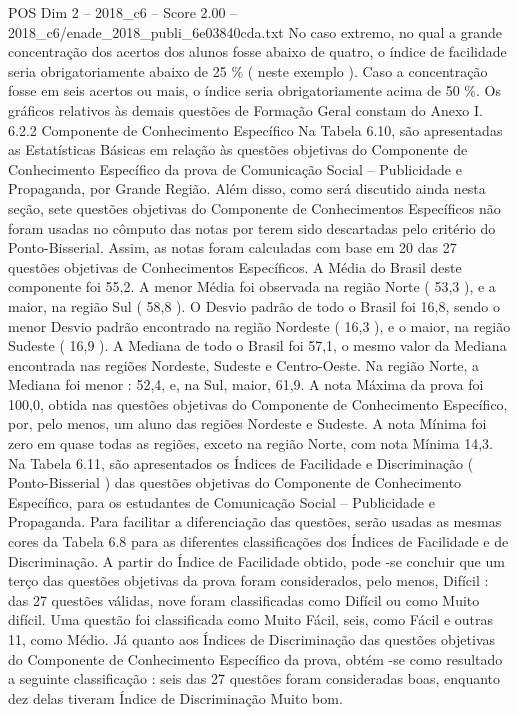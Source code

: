 \begin{textsample}{POS Dim 2 – 2018\_c6 – Score 2.00 – 2018\_c6/enade\_2018\_publi\_6e03840cda.txt}
No caso extremo, no qual a grande concentração dos acertos dos alunos fosse abaixo de quatro, o índice de facilidade seria obrigatoriamente abaixo de 25 \% ( neste exemplo ).
Caso a concentração fosse em seis acertos ou mais, o índice seria obrigatoriamente acima de 50 \%.
Os gráficos relativos às demais questões de Formação Geral constam do Anexo I. 6.2.2 Componente de Conhecimento Específico Na Tabela 6.10, são apresentadas as Estatísticas Básicas em relação às questões objetivas do Componente de Conhecimento Específico da prova de Comunicação Social – Publicidade e Propaganda, por Grande Região.
Além disso, como será discutido ainda nesta seção, sete questões objetivas do Componente de Conhecimentos Específicos não foram usadas no cômputo das notas por terem sido descartadas pelo critério do Ponto-Bisserial.
Assim, as notas foram calculadas com base em 20 das 27 questões objetivas de Conhecimentos Específicos.
A Média do Brasil deste componente foi 55,2.
A menor Média foi observada na região Norte ( 53,3 ), e a maior, na região Sul ( 58,8 ).
O Desvio padrão de todo o Brasil foi 16,8, sendo o menor Desvio padrão encontrado na região Nordeste ( 16,3 ), e o maior, na região Sudeste ( 16,9 ).
A Mediana de todo o Brasil foi 57,1, o mesmo valor da Mediana encontrada nas regiões Nordeste, Sudeste e Centro-Oeste.
Na região Norte, a Mediana foi menor : 52,4, e, na Sul, maior, 61,9.
A nota Máxima da prova foi 100,0, obtida nas questões objetivas do Componente de Conhecimento Específico, por, pelo menos, um aluno das regiões Nordeste e Sudeste.
A nota Mínima foi zero em quase todas as regiões, exceto na região Norte, com nota Mínima 14,3.
Na Tabela 6.11, são apresentados os Índices de Facilidade e Discriminação ( Ponto-Bisserial ) das questões objetivas do Componente de Conhecimento Específico, para os estudantes de Comunicação Social – Publicidade e Propaganda.
Para facilitar a diferenciação das questões, serão usadas as mesmas cores da Tabela 6.8 para as diferentes classificações dos Índices de Facilidade e de Discriminação.
A partir do Índice de Facilidade obtido, pode -se concluir que um terço das questões objetivas da prova foram considerados, pelo menos, Difícil : das 27 questões válidas, nove foram classificadas como Difícil ou como Muito difícil.
Uma questão foi classificada como Muito Fácil, seis, como Fácil e outras 11, como Médio.
Já quanto aos Índices de Discriminação das questões objetivas do Componente de Conhecimento Específico da prova, obtém -se como resultado a seguinte classificação : seis das 27 questões foram consideradas boas, enquanto dez delas tiveram Índice de Discriminação Muito bom.

\end{textsample}
